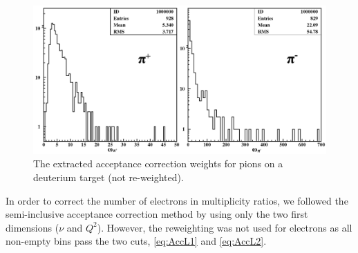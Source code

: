 \begin{figure}[tbp]
\centering
\includegraphics[width=14cm] {chap5-fig/pawpipdeut.png}
\caption {The extracted acceptance correction weights for pions on a deuterium target (not re-weighted).}
\label{fig:AccCoef}
\end{figure}

In order to correct the number of electrons in multiplicity ratios, we followed the 
semi-inclusive acceptance correction method by using only the two first dimensions 
($\nu$ and $Q^2$). However, the reweighting was not used for electrons as all 
non-empty bins pass the two cuts, \ref{eq:AccL1} and \ref{eq:AccL2}.

